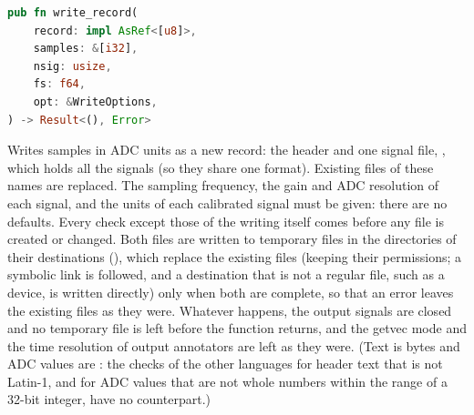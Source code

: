 \begin{lstlisting}[language=Rust,style=signature]
pub fn write_record(
    record: impl AsRef<[u8]>,
    samples: &[i32],
    nsig: usize,
    fs: f64,
    opt: &WriteOptions,
) -> Result<(), Error>
\end{lstlisting}
Writes samples in ADC units as a new record: the header  and one signal
file, , which holds all the signals (so they share one format). Existing
files of these names are replaced. The sampling frequency, the gain and ADC resolution
of each signal, and the units of each calibrated signal must be given: there are no
defaults. Every check except those of the writing itself comes before any file is
created or changed. Both files are written to temporary files in the directories of their
destinations (), which replace the existing files (keeping their
permissions; a symbolic link is followed, and a destination that is not a regular file,
such as a device, is written directly) only when both are complete, so that an error
leaves the existing files as they were. Whatever happens, the output signals are closed
and no temporary file is left before the function returns, and the getvec mode and the
time resolution of output annotators are left as they were. (Text is bytes and ADC values
are : the checks of the other languages for header text that is not Latin-1, and
for ADC values that are not whole numbers within the range of a 32-bit integer, have no
counterpart.)
